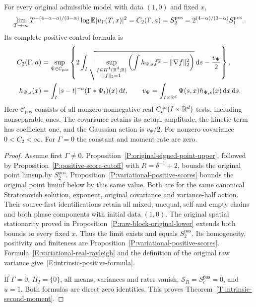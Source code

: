 \begin{theorem}
  \label{T:intrinsic-second-moment}
  For every original admissible model with data $(1,0)$ and fixed $x$,
  \begin{equation}\label{E:intrinsic-second-moment-limit}
    \lim_{T\to\infty}T^{-(4-\alpha-a)/(3-\alpha)}
    \log\mathbb{E}|u_\Gamma(T,x)|^2
    =C_2(\Gamma,a)=S_2^{\mathrm{pos}}
    =2^{(4-\alpha)/(3-\alpha)}S_1^{\mathrm{pos}}.
  \end{equation}
  Its complete positive-control formula is
  \begin{align}
    C_2(\Gamma,a)
    &=\sup_{\Psi\in\mathcal C_{\mathrm{pos}}}
    \left\{2\int_I
    \sqrt{\sup_{\substack{f\in H^1(\mathbb{R}^d;\mathbb{R})\\\|f\|_2=1}}
    \left(\int h_{\Psi,s}f^2-\|\nabla f\|_2^2\right)}
    \,\mathrm{d} s-\frac{v_\Psi}{2}\right\},
    \label{E:intrinsic-positive-formula}\\
    h_{\Psi,s}(x)
    &=\int_I|s-t|^{-a}(\Gamma*\Psi_t)(x)\,\mathrm{d} t,\qquad
    v_\Psi=\int_{I\times\mathbb{R}^d}\Psi(s,x)h_{\Psi,s}(x)\,\mathrm{d} x\,\mathrm{d} s.
    \notag
  \end{align}
  Here $\mathcal C_{\mathrm{pos}}$ consists of all nonzero nonnegative
  real $C_c^\infty(I\times\mathbb{R}^d)$ tests, including nonseparable ones.
  The covariance retains its actual amplitude, the kinetic term has
  coefficient one, and the Gaussian action is $v_\Psi/2$.
  For nonzero covariance $0<C_2<\infty$.
  For $\Gamma=0$ the constant and moment rate are zero.
\end{theorem}

\begin{proof}
  Assume first $\Gamma\ne0$.
  Proposition~\ref{P:original-signed-point-upper}, followed by
  Proposition~\ref{P:positive-score-cutoff} with $R=\delta^{-1}+2$,
  bounds the original point limsup by $S_2^{\mathrm{pos}}$.
  Proposition~\ref{P:variational-positive-scores} bounds the original
  point liminf below by this same value.
  Both are for the same canonical Stratonovich solution, exponent,
  original covariance and variance-half action.
  Their source-first identifications retain all mixed, unequal, self
  and empty chains and both phase components with initial data $(1,0)$.
  The original spatial stationarity proved in
  Proposition~\ref{P:raw-block-original-lower} extends both bounds to
  every fixed $x$.
  Thus the limit exists and equals $S_2^{\mathrm{pos}}$.
  Its homogeneity, positivity and finiteness are
  Proposition~\ref{P:variational-positive-scores}.
  Formula~\eqref{E:variational-real-rayleigh} and the definition of the
  original raw variance give~\eqref{E:intrinsic-positive-formula}.

  If $\Gamma=0$, $H_I=\{0\}$, all means, variances and rates vanish,
  $\mathcal S_R=S_c^{\mathrm{pos}}=0$, and $u=1$.
  Both formulas are direct zero identities.
  This proves Theorem~\ref{T:intrinsic-second-moment}.
\end{proof}


